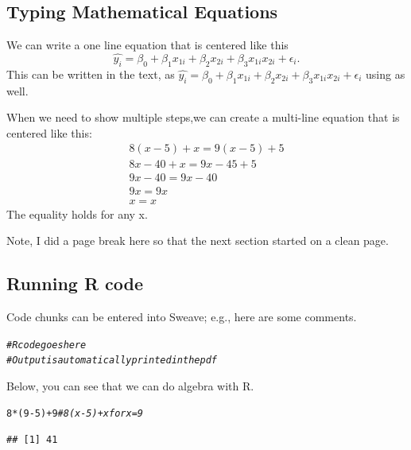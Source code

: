 \documentclass{article}\usepackage[]{graphicx}\usepackage[]{xcolor}
\makeatletter
\newcommand{\hlnum}[1]{\textcolor[rgb]{0.686,0.059,0.569}{#1}}%
\newcommand{\hlcom}[1]{\textcolor[rgb]{0.678,0.584,0.686}{\textit{#1}}}%
\newcommand{\hlopt}[1]{\textcolor[rgb]{0,0,0}{#1}}%
\newcommand{\hldef}[1]{\textcolor[rgb]{0.345,0.345,0.345}{#1}}%
\newenvironment{kframe}{%
 \def\at@end@of@kframe{}%
 \ifinner\ifhmode%
  \def\at@end@of@kframe{\end{minipage}}%
  \begin{minipage}{\columnwidth}%
 \fi\fi%
 \def\FrameCommand##1{\hskip\@totalleftmargin \hskip-\fboxsep
 \colorbox{shadecolor}{##1}\hskip-\fboxsep
     \hskip-\linewidth \hskip-\@totalleftmargin \hskip\columnwidth}%
 \MakeFramed {\advance\hsize-\width
   \@totalleftmargin\z@ \linewidth\hsize
   \@setminipage}}%
 {\par\unskip\endMakeFramed%
 \at@end@of@kframe}
\newenvironment{knitrout}{}{} %
\makeatother
\begin{document}
\begin{multicols}{2}
\subsection{Typing Mathematical Equations}
We can write a one line equation that is centered like this
\[\widehat{y_i} = \beta_0 + \beta_1 x_{1i}+ \beta_2 x_{2i} +\beta_3 x_{1i} x_{2i} + \epsilon_i.\]
This can be written in the text, as $\widehat{y_i} = \beta_0 + \beta_1 x_{1i}+ \beta_2 x_{2i} +\beta_3 x_{1i} x_{2i} + \epsilon_i$ using as well.

When we need to show multiple steps,we can create a
 multi-line equation that is centered like this:
\begin{align*}
 8(x-5)+x=9(x-5)+5\\
 8x-40+x=9x-45+5 \tag{Distributing}\\
 9x-40=9x-40 \tag{Combining like terms}\\
 9x=9x \tag{Adding 40 to both sides}\\
 x=x \tag{Dividing both sides by 9}
\end{align*}
The equality holds for any x.

Note, I did a page break here so that the next section
 started on a clean page.
\pagebreak

\subsection{Running R code}
 Code chunks can be entered into Sweave; e.g., here are some
 comments.
\begin{knitrout}
\color{fgcolor}\begin{kframe}
\begin{alltt}
\hlcom{# R code goes here}
\hlcom{# Output is automatically printed in the pdf}
\end{alltt}
\end{kframe}
\end{knitrout}
 
Below, you can see that we can do algebra with R.

\begin{knitrout}
\color{fgcolor}\begin{kframe}
\begin{alltt}
\hlnum{8}\hlopt{*}\hldef{(}\hlnum{9}\hlopt{-}\hlnum{5}\hldef{)}\hlopt{+}\hlnum{9} \hlcom{# 8(x-5) + x for x=9}
\end{alltt}
\begin{verbatim}
## [1] 41
\end{verbatim}
\end{kframe}
\end{knitrout}


\end{multicols}
\end{document}
